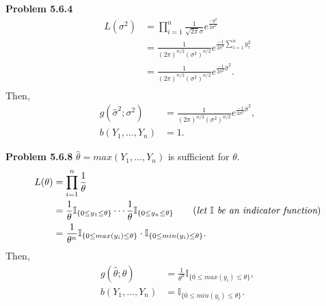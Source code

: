 \documentclass{article}
\begin{document}
\textbf{Problem 5.6.4}
\begin{align*}
    L(\sigma^2) & = \prod_{i=1}^{n}\frac{1}{\sqrt{2\pi}\sigma}e^{\frac{-y^2}{2\sigma^2}} \\
    & = \frac{1}{(2\pi)^{n/2}(\sigma^2)^{n/2}}e^{\frac{-1}{2\sigma^2}\sum_{i=1}^{n}y_i^2} \\
    & = \frac{1}{(2\pi)^{n/2}(\sigma^2)^{n/2}}e^{\frac{-1}{2\sigma^2}\hat{\sigma}^2}. \\
\end{align*}
Then, 
\begin{align*}
    g(\hat{\sigma}^2;\sigma^2) & = \frac{1}{(2\pi)^{n/2}(\sigma^2)^{n/2}}e^{\frac{-1}{2\sigma^2}\hat{\sigma}^2}, \\
    b(Y_1,\dots,Y_n) & = 1.
\end{align*}
\bigbreak

\textbf{Problem 5.6.8}
$\hat{\theta} = max(Y_1, \dots, Y_n)$ is sufficient for $\theta$.
\begin{align*}
    L(\theta) & = \prod_{i=1}^{n}\frac{1}{\theta} \\
    & = \frac{1}{\theta}\mathbb{I}_{\{0\le y_1\le\theta\}}\cdots \frac{1}{\theta}\mathbb{I}_{\{0\le y_n\le\theta\}} \qquad (\emph{let }\mathbb{I} \emph{ be an indicator function})\\
    & = \frac{1}{\theta^n}\mathbb{I}_{\{0\le max(y_i)\le \theta\}}\cdot \mathbb{I}_{\{0\le min(y_i)\le \theta\}}. \\
\end{align*}
Then, 
\begin{align*}
    g(\hat{\theta};\theta) & = \frac{1}{\theta^n}\mathbb{I}_{\{0\le max(y_i)\le \theta\}}, \\
    b(Y_1,\dots,Y_n) & = \mathbb{I}_{\{0\le min(y_i)\le \theta\}}.
\end{align*}
\end{document}
